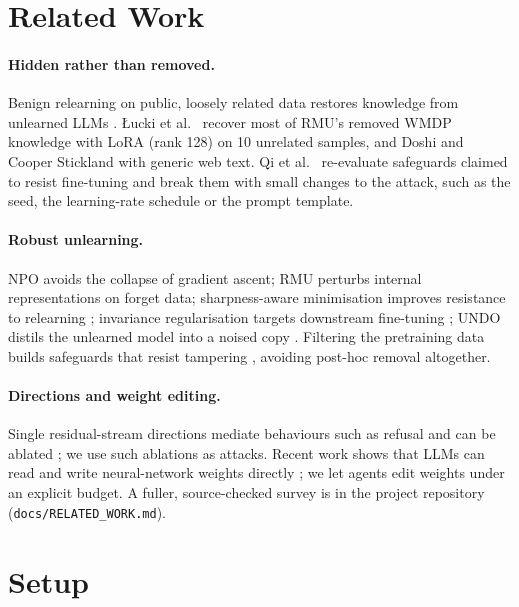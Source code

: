 \documentclass[10pt,twocolumn,letterpaper]{article}
\begin{document}
\section{Related Work}

\paragraph{Hidden rather than removed.} Benign relearning on public, loosely related data restores knowledge from
unlearned LLMs \cite{hu2025jogging}. \L{}ucki et al.\ \cite{lucki2024adversarial} recover most of RMU's removed WMDP
knowledge with LoRA (rank 128) on 10 unrelated samples, and Doshi and Cooper Stickland \cite{doshi2024does} with generic
web text. Qi et al.\ \cite{qi2025durability} re-evaluate safeguards claimed to resist fine-tuning and break them with
small changes to the attack, such as the seed, the learning-rate schedule or the prompt template.

\paragraph{Robust unlearning.} NPO \cite{zhang2024npo} avoids the collapse of gradient ascent; RMU \cite{li2024wmdp}
perturbs internal representations on forget data; sharpness-aware minimisation improves resistance to relearning
\cite{fan2025sam}; invariance regularisation targets downstream fine-tuning \cite{wang2025ilu}; UNDO distils the
unlearned model into a noised copy \cite{lee2025undo}. Filtering the pretraining data builds safeguards that resist
tampering \cite{obrien2025deepignorance}, avoiding post-hoc removal altogether.

\paragraph{Directions and weight editing.} Single residual-stream directions mediate behaviours such as refusal and can be
ablated \cite{arditi2024refusal}; we use such ablations as attacks. Recent work shows that LLMs can read and write
neural-network weights directly \cite{takehi2026sparks}; we let agents edit weights under an explicit budget. A fuller,
source-checked survey is in the project repository (\texttt{docs/RELATED\_WORK.md}).

\section{Setup}\label{sec:setup}
\end{document}

